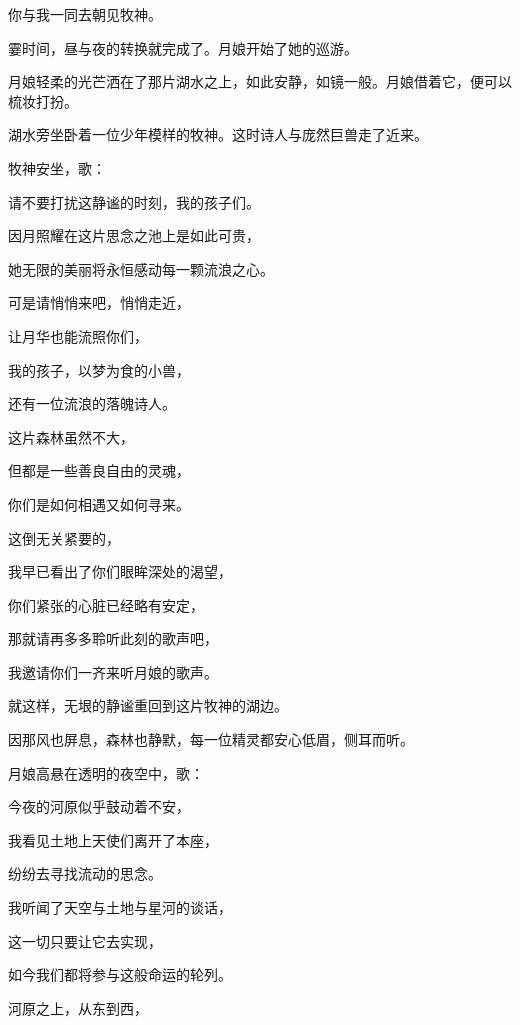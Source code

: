 \documentclass[UTF8]{article}
\begin{document}
\par 你与我一同去朝见牧神。
\\[0.6cm]
\par 霎时间，昼与夜的转换就完成了。月娘开始了她的巡游。
\par 月娘轻柔的光芒洒在了那片湖水之上，如此安静，如镜一般。月娘借着它，便可以梳妆打扮。
\par 湖水旁坐卧着一位少年模样的牧神。这时诗人与庞然巨兽走了近来。
\\[0.6cm]
\par 牧神安坐，歌：
\\[0.6cm]
\par 请不要打扰这静谧的时刻，我的孩子们。
\par 因月照耀在这片思念之池上是如此可贵，
\par 她无限的美丽将永恒感动每一颗流浪之心。
\par 可是请悄悄来吧，悄悄走近，
\par 让月华也能流照你们，
\par 我的孩子，以梦为食的小兽，
\par 还有一位流浪的落魄诗人。
\par 这片森林虽然不大，
\par 但都是一些善良自由的灵魂，
\par 你们是如何相遇又如何寻来。
\par 这倒无关紧要的，
\par 我早已看出了你们眼眸深处的渴望，
\par 你们紧张的心脏已经略有安定，
\par 那就请再多多聆听此刻的歌声吧，
\par 我邀请你们一齐来听月娘的歌声。
\\[0.6cm]
\par 就这样，无垠的静谧重回到这片牧神的湖边。
\par 因那风也屏息，森林也静默，每一位精灵都安心低眉，侧耳而听。
\\[0.6cm]
\par 月娘高悬在透明的夜空中，歌：
\\[0.6cm]
\par 今夜的河原似乎鼓动着不安，
\par 我看见土地上天使们离开了本座，
\par 纷纷去寻找流动的思念。
\par 我听闻了天空与土地与星河的谈话，
\par 这一切只要让它去实现，
\par 如今我们都将参与这般命运的轮列。
\par 河原之上，从东到西，
\end{document}

